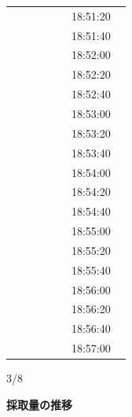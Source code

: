 \documentclass[UTF8,10pt,a4paper,fontset=fandol]{ctexart}
\newcommand{\handwritten}[1]{#1}
\begin{document}
\begin{center}
\begin{tabular}{p{0.42\linewidth}p{0.42\linewidth}}
 & 18:51:20 \\
 & 18:51:40 \\
 & 18:52:00 \\
 & 18:52:20 \\
 & 18:52:40 \\
 & 18:53:00 \\
 & 18:53:20 \\
 & 18:53:40 \\
 & 18:54:00 \\
 & 18:54:20 \\
 & 18:54:40 \\
 & 18:55:00 \\
 & 18:55:20 \\
 & 18:55:40 \\
 & 18:56:00 \\
 & 18:56:20 \\
 & 18:56:40 \\
 & 18:57:00 \\
\end{tabular}
\end{center}

\handwritten{3/8}

\newpage

\begin{center}
\textbf{採取量の推移}
\end{center}
\end{document}
